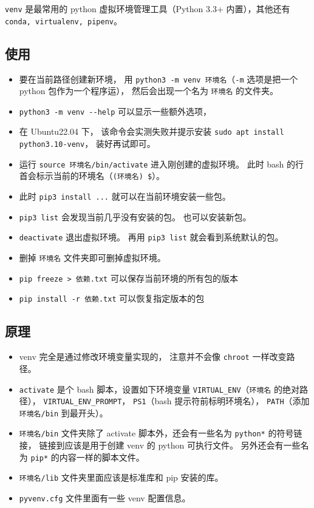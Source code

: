 

\verb`venv` 是最常用的 python 虚拟环境管理工具（Python 3.3+ 内置），其他还有 \verb`conda, virtualenv, pipenv`。

\subsection{使用}
\begin{itemize}
\item 要在当前路径创建新环境， 用 \verb`python3 -m venv 环境名`（\verb`-m` 选项是把一个 python 包作为一个程序运）， 然后会出现一个名为 \verb`环境名` 的文件夹。
\item \verb`python3 -m venv --help` 可以显示一些额外选项，
\item 在 Ubuntu22.04 下， 该命令会实测失败并提示安装 \verb`sudo apt install python3.10-venv`， 装好再试即可。
\item 运行 \verb`source 环境名/bin/activate` 进入刚创建的虚拟环境。 此时 bash 的行首会标示当前的环境名（\verb`(环境名) $`）。
\item 此时 \verb`pip3 install ...` 就可以在当前环境安装一些包。
\item \verb`pip3 list` 会发现当前几乎没有安装的包。 也可以安装新包。
\item \verb`deactivate` 退出虚拟环境。 再用 \verb`pip3 list` 就会看到系统默认的包。
\item 删掉 \verb`环境名` 文件夹即可删掉虚拟环境。
\item \verb`pip freeze > 依赖.txt` 可以保存当前环境的所有包的版本
\item \verb`pip install -r 依赖.txt` 可以恢复指定版本的包
\end{itemize}

\subsection{原理}
\begin{itemize}
\item venv 完全是通过修改环境变量实现的， 注意并不会像 \verb`chroot` 一样改变路径。
\item \verb`activate` 是个 bash 脚本，设置如下环境变量 \verb`VIRTUAL_ENV`（\verb`环境名` 的绝对路径）， \verb`VIRTUAL_ENV_PROMPT`， \verb`PS1`（bash 提示符前标明环境名）， \verb`PATH`（添加 \verb`环境名/bin` 到最开头）。
\item \verb`环境名/bin` 文件夹除了 activate 脚本外，还会有一些名为 \verb`python*` 的符号链接， 链接到应该是用于创建 venv 的 python 可执行文件。 另外还会有一些名为 \verb`pip*` 的内容一样的脚本文件。
\item \verb`环境名/lib` 文件夹里面应该是标准库和 pip 安装的库。
\item \verb`pyvenv.cfg` 文件里面有一些 venv 配置信息。
\end{itemize}

